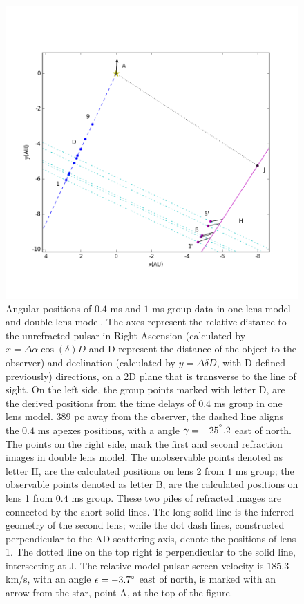 \documentclass[useAMS,usenatbib]{mn2e}
\begin{document}
\begin{figure}
\centering
\includegraphics[width=1.0\textwidth, angle=0]{Double_lens_xy.png}
\caption{Angular positions of $0.4$ ms and $1$ ms group data in one lens model and double lens model. The axes represent the relative distance to the unrefracted pulsar in Right Ascension (calculated by $x= \Delta \alpha \cos(\delta)D$ and D represent the distance of the object to the observer) and declination (calculated by $y=\Delta \delta D$, with D defined previously) directions, on a 2D plane that is transverse to the line of sight. %
On the left side, the group points marked with letter D, are the derived positions from the time delays of $0.4$ ms group in one lens model. $389$ pc away from the observer, the dashed line aligns the $0.4$ ms apexes positions, with a angle $\gamma=-25^{\degree}.2$ east of north. The points on the right side, mark the first and second refraction images in double lens model. The unobservable points denoted as letter H, are the calculated positions on lens 2 from $1$ ms group; the observable points denoted as letter B, are the calculated positions on lens 1 from $0.4$ ms group. These two piles of refracted images are connected by the short solid lines. The long solid line is the inferred geometry of the second lens; while the dot dash lines, constructed perpendicular to the AD scattering axis, denote the positions of lens 1. The dotted line on the top right is perpendicular to the solid line, intersecting at J. %
The relative model pulsar-screen velocity is $185.3$ km/s, with an angle $\epsilon=-3.7\degree$ east of north, is marked with an arrow from the star, point A, at the top of the figure.} 
\label{Doublelens}
\end{figure}
\end{document}
